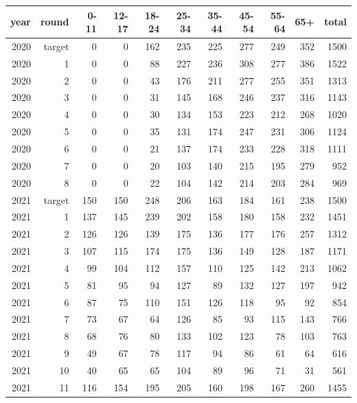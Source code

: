\documentclass[fleqn,10pt]{wlscirep}
\begin{document}
\begin{table}[ht]
\centering
\begin{tabular}{rrrrrrrrrrr}
  \hline
year & round & 0-11 & 12-17 & 18-24 & 25-34 & 35-44 & 45-54 & 55-64 & 65+ & total \\ 
  \hline
  2020 &  target &   0 &   0 & 162 & 235 & 225 & 277 & 249 & 352 & 1500 \\ 
  2020 &   1 &   0 &   0 &  88 & 227 & 236 & 308 & 277 & 386 & 1522 \\ 
  2020 &   2 &   0 &   0 &  43 & 176 & 211 & 277 & 255 & 351 & 1313 \\ 
  2020 &   3 &   0 &   0 &  31 & 145 & 168 & 246 & 237 & 316 & 1143 \\ 
  2020 &   4 &   0 &   0 &  30 & 134 & 153 & 223 & 212 & 268 & 1020 \\ 
  2020 &   5 &   0 &   0 &  35 & 131 & 174 & 247 & 231 & 306 & 1124 \\ 
  2020 &   6 &   0 &   0 &  21 & 137 & 174 & 233 & 228 & 318 & 1111 \\ 
  2020 &   7 &   0 &   0 &  20 & 103 & 140 & 215 & 195 & 279 & 952 \\ 
  2020 &   8 &   0 &   0 &  22 & 104 & 142 & 214 & 203 & 284 & 969 \\ 
  \hline
  2021 &   target & 150 & 150 & 248 & 206 & 163 & 184 & 161 & 238 & 1500 \\ 
  2021 &   1 & 137 & 145 & 239 & 202 & 158 & 180 & 158 & 232 & 1451 \\ 
  2021 &   2 & 126 & 126 & 139 & 175 & 136 & 177 & 176 & 257 & 1312 \\ 
  2021 &   3 & 107 & 115 & 174 & 175 & 136 & 149 & 128 & 187 & 1171 \\ 
  2021 &   4 &  99 & 104 & 112 & 157 & 110 & 125 & 142 & 213 & 1062 \\ 
  2021 &   5 &  81 &  95 &  94 & 127 &  89 & 132 & 127 & 197 & 942 \\ 
  2021 &   6 &  87 &  75 & 110 & 151 & 126 & 118 &  95 &  92 & 854 \\ 
  2021 &   7 &  73 &  67 &  64 & 126 &  85 &  93 & 115 & 143 & 766 \\ 
  2021 &   8 &  68 &  76 &  80 & 133 & 102 & 123 &  78 & 103 & 763 \\ 
  2021 &   9 &  49 &  67 &  78 & 117 &  94 &  86 &  61 &  64 & 616 \\ 
  2021 &  10 &  40 &  65 &  65 & 104 &  89 &  96 &  71 &  31 & 561 \\ 
  2021 &  11 & 116 & 154 & 195 & 205 & 160 & 198 & 167 & 260 & 1455 \\ 

\end{tabular}
\end{table}
\end{document}

